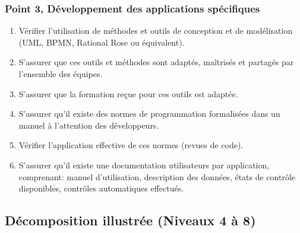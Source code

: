 \subsubsection{Point 3, Développement des applications spécifiques}
\begin{enumerate}[label=3.\arabic*.]
    \item Vérifier l'utilisation de méthodes et outils de conception et de modélisation (UML, BPMN, Rational Rose ou équivalent).
    \item S'assurer que ces outils et méthodes sont adaptés, maîtrisés et partagés par l'ensemble des équipes.
    \item S'assurer que la formation reçue pour ces outils est adaptée.
    \item S'assurer qu'il existe des normes de programmation formalisées dans un manuel à l'attention des développeurs.
    \item Vérifier l'application effective de ces normes (revues de code).
    \item S'assurer qu'il existe une documentation utilisateurs par application, comprenant: manuel d'utilisation, description des données, états de contrôle disponibles, contrôles automatiques effectués.
\end{enumerate}

\subsection{Décomposition illustrée (Niveaux 4 à 8)}

